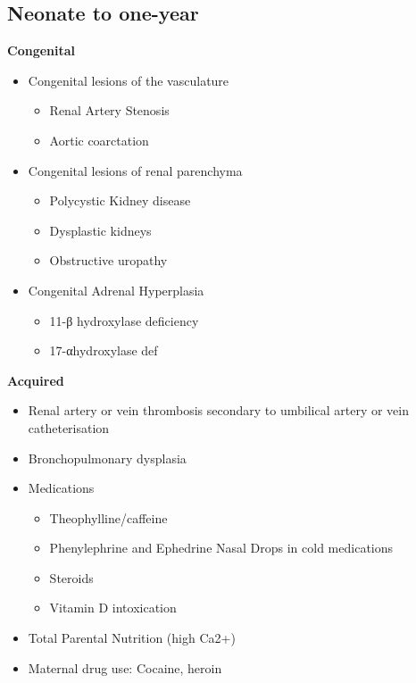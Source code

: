\documentclass[
  letterpaper,
  DIV=11,
  numbers=noendperiod]{scrreprt}
\providecommand{\tightlist}{%
  \setlength{\itemsep}{0pt}\setlength{\parskip}{0pt}}\usepackage{longtable,booktabs,array}
\begin{document}
\hypertarget{neonate-to-one-year}{%
\subsection{Neonate to one-year}\label{neonate-to-one-year}}

\textbf{Congenital}

\begin{itemize}
\tightlist
\item
  Congenital lesions of the vasculature

  \begin{itemize}
  \tightlist
  \item
    Renal Artery Stenosis
  \item
    Aortic coarctation
  \end{itemize}
\item
  Congenital lesions of renal parenchyma

  \begin{itemize}
  \tightlist
  \item
    Polycystic Kidney disease
  \item
    Dysplastic kidneys
  \item
    Obstructive uropathy
  \end{itemize}
\item
  Congenital Adrenal Hyperplasia

  \begin{itemize}
  \tightlist
  \item
    11-β hydroxylase deficiency
  \item
    17-αhydroxylase def
  \end{itemize}
\end{itemize}

\textbf{Acquired}

\begin{itemize}
\tightlist
\item
  Renal artery or vein thrombosis secondary to umbilical artery or vein
  catheterisation
\item
  Bronchopulmonary dysplasia
\item
  Medications

  \begin{itemize}
  \tightlist
  \item
    Theophylline/caffeine
  \item
    Phenylephrine and Ephedrine Nasal Drops in cold medications
  \item
    Steroids
  \item
    Vitamin D intoxication
  \end{itemize}
\item
  Total Parental Nutrition (high Ca2+)
\item
  Maternal drug use: Cocaine, heroin
\end{itemize}
\end{document}
